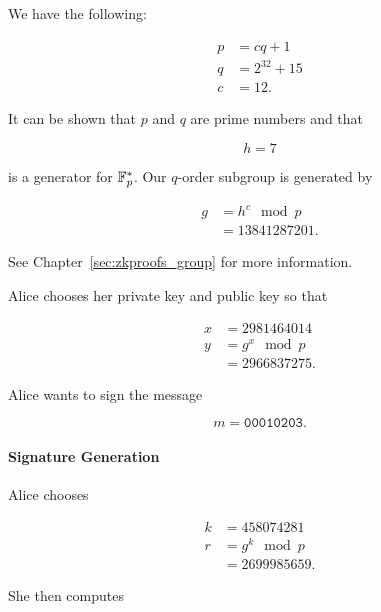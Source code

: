 \begin{example}
\label{example:schnorr_signature}

We have the following:

\begin{align}
    p &= cq + 1 \nonumber\\
    q &= 2^{32} + 15 \nonumber\\
    c &= 12.
\end{align}

\noindent
It can be shown that $p$ and $q$ are prime numbers
and that

\begin{equation}
    h = 7
\end{equation}

\noindent
is a generator for $\mathbb{F}_{p}^{*}$.
Our $q$-order \gls{subgroup} is generated by

\begin{align}
    g &= h^{c} \mod p \nonumber\\
        &= 13841287201.
\end{align}

\noindent
See Chapter~\ref{sec:zkproofs_group} for more information.

Alice chooses her private key and public key so that

\begin{align}
    x &= 2981464014 \nonumber\\
    y &= g^{x} \mod p \nonumber\\
        &= 2966837275.
\end{align}

\noindent
Alice wants to sign the message

\begin{equation}
    m = \texttt{00010203}.
\end{equation}

\paragraph{Signature Generation}
Alice chooses

\begin{align}
    k &= 458074281 \nonumber\\
    r &= g^{k} \mod p \nonumber\\
        &= 2699985659.
\end{align}

\noindent
She then computes


\end{example}
